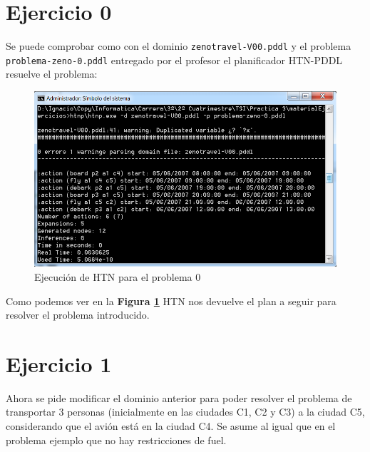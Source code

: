 \newpage %

\tableofcontents %

\listoffigures


\newpage





\section{Ejercicio 0}
Se puede comprobar como con el dominio \texttt{zenotravel-V00.pddl} y el problema  \texttt{problema-zeno-0.pddl} entregado por el profesor el planificador HTN-PDDL resuelve el problema:

\begin{figure}[h]
\centering
\includegraphics[width=0.9\linewidth]{p0}
\caption{Ejecución de HTN para el problema 0}
\label{fig:p0}
\end{figure}

Como podemos ver en la \textbf{Figura \ref{fig:p0}} HTN nos devuelve el plan a seguir para resolver el problema introducido.


\section{Ejercicio 1}

Ahora se pide modificar el dominio anterior para poder resolver el problema de transportar 3 personas (inicialmente en las ciudades C1, C2 y C3) a la ciudad C5, considerando que el avión está en la ciudad C4. Se asume al igual que en el problema ejemplo que no hay restricciones de fuel.\\

